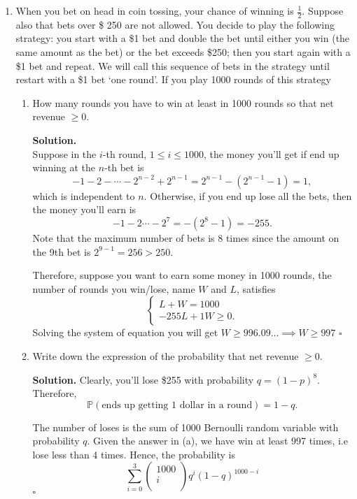 \documentclass[12pt]{article}
\begin{document}
\begin{enumerate}
\item
When you bet on head in coin tossing, your chance of winning is \(\frac{1}{2}\).
Suppose also that bets over \$ 250 are not allowed.
You decide to play the following strategy: you start with a \$1 bet and double the bet until either you
win (the same amount as the bet) or the bet exceeds \$250;
then you start again with a \$1 bet and repeat. We will call
this sequence of bets in the strategy until restart with a \$1
bet ‘one round’. If you play 1000 rounds of this strategy

\begin{enumerate}
    \item How many rounds you have to win at least in 1000 rounds so that net revenue \(\geq 0\).
    
    \textbf{Solution.} \\ 
    Suppose in the $i$-th round, $1\leq i\leq 1000$, the money you'll get if end up winning at the $n$-th bet is
\begin{equation*}
-1-2-\cdots-2^{n-2}+2^{n-1}=2^{n-1}-(2^{n-1}-1)=1,
\end{equation*}
which is independent to $n$. Otherwise, if you end up lose all the bets, then the money you'll earn is
\begin{equation*}
-1-2\cdots-2^7=-(2^8-1) = -255.
\end{equation*}
Note that the maximum number of bets is $8$ times since the amount on the 9th bet is $2^{9-1} = 256>250$. 

Therefore, suppose you want to earn some money in 1000 rounds, the number of rounds you win/lose, name \(W\) and \(L\), satisfies 
\[
    \begin{cases}
        L + W  = 1000\\
        -255L + 1W \geq  0  .
    \end{cases}
\]  
Solving the system of equation you will get \(W \geq  996.09\dots \implies W \geq 997\) 
\hspace{\linewidth}\({\square}\) 


    \item Write down the expression of the probability that net revenue \(\geq 0\).

    \textbf{Solution.} 
    Clearly, you'll lose \$255 with probability $q=(1-p)^8$. Therefore, 
\[\mathbb{P}(\text{ends up getting $1$ dollar in a round})=1-q.\]

    The number of loses is the sum of 1000 Bernoulli random variable with probability \(q\). 
    Given the answer in (a), we have win at least 997 times, i.e lose less than 4 times. 
    Hence, the probability is 
    \[
        \sum_{i=0}^{3} \begin{pmatrix}
             1000 \\
             i \\
        \end{pmatrix}q^i(1-q)^{1000-i}
    \] 
        \hspace{\linewidth}\(\square\) 
\end{enumerate}





\end{enumerate}
\end{document}
